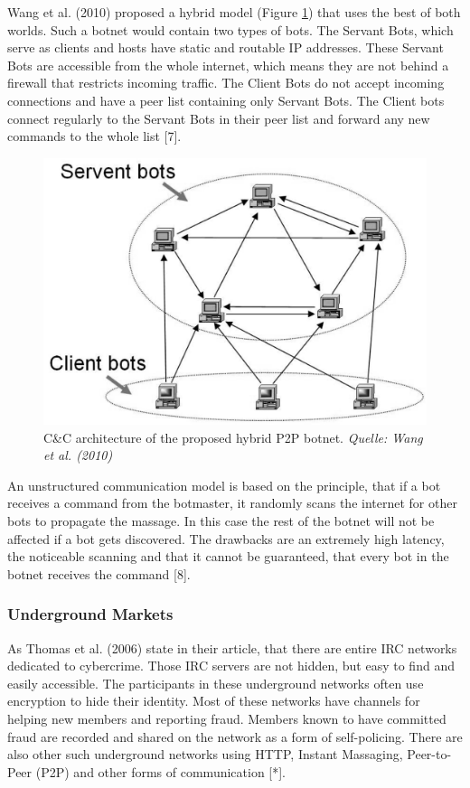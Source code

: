 Wang et al. (2010) proposed a hybrid model (Figure \ref{fig:hybrid}) that uses the best of both worlds. Such a botnet would contain two types of bots. The Servant Bots, which serve as clients and hosts have static and routable IP addresses. These Servant Bots are accessible from the whole internet, which means they are not behind a firewall that restricts incoming traffic. The Client Bots do not accept incoming connections and have a peer list containing only Servant Bots. The Client bots connect regularly to the Servant Bots in their peer list and forward any new commands to the whole list [7].

\begin{figure}[ht]
\begin{center} \includegraphics[scale=0.3]{Talk11/CC-hybrid} \end{center}
\caption{C\&C architecture of the proposed hybrid P2P botnet. \textit{Quelle: Wang et al. (2010)}}
\label{fig:hybrid}
\end{figure}

An unstructured communication model is based on the principle, that if a bot receives a command from the botmaster, it randomly scans the internet for other bots to propagate the massage. In this case the rest of the botnet will not be affected if a bot gets discovered. The drawbacks are an extremely high latency, the noticeable scanning and that it cannot be guaranteed, that every bot in the botnet receives the command [8].

		\subsubsection{Underground Markets}
As Thomas et al. (2006) state in their article, that there are entire IRC networks dedicated to cybercrime. Those IRC servers are not hidden, but easy to find and easily accessible. The participants in these underground networks often use encryption to hide their identity.
Most of these networks have channels for helping new members and reporting fraud. Members known to have committed fraud are recorded and shared on the network as a form of self-policing.
There are also other such underground networks using HTTP, Instant Massaging, Peer-to-Peer (P2P) and other forms of communication [*].

